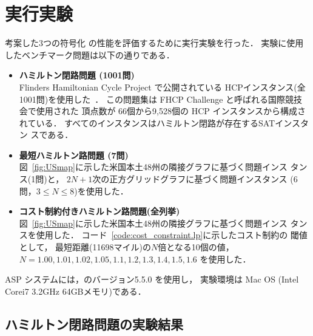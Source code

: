 ﻿%
\section{実行実験}\label{chap:experiment}

考案した3つの符号化
の性能を評価するために実行実験を行った．
実験に使用したベンチマーク問題は以下の通りである．

\begin{itemize}
\item \textbf{ハミルトン閉路問題 (1001問)}\\
  Flinders Hamiltonian Cycle Project で公開されている
  HCPインスタンス(全1001問)を使用した~\cite{haythorpe19:fhcp}．
  この問題集は FHCP Challenge と呼ばれる国際競技会で使用された
  頂点数が 66個から9,528個の HCP インスタンスから構成されている．
  すべてのインスタンスはハミルトン閉路が存在する\textsf{SAT}インスタン
  スである．
\item \textbf{最短ハミルトン路問題 (7問)}\\
  図~\ref{fig:USmap}に示した米国本土48州の隣接グラフに基づく問題インス
  タンス(1問)と，
  $2N+1$次の正方グリッドグラフに基づく問題インスタンス
  (6問，$3\leq N\leq 8$)を使用した．
\item \textbf{コスト制約付きハミルトン路問題(全列挙)}\\
  図~\ref{fig:USmap}に示した米国本土48州の隣接グラフに基づく問題インス
  タンスを使用した．
  コード~\ref{code:cost_constraint.lp}に示したコスト制約の
  閾値として，
  最短距離(11698マイル)の$N$倍となる10個の値，
  $N=1.00,1.01,1.02,1.05,1.1,1.2,1.3,1.4,1.5,1.6$
  を使用した．
\end{itemize}

ASP システムには，{\clingo}のバージョン5.5.0 を使用し，
実験環境は Mac OS (Intel Corei7 3.2GHz 64GBメモリ)である．

\subsection{ハミルトン閉路問題の実験結果}


